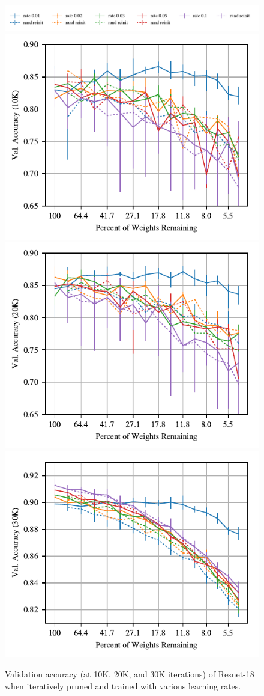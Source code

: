 \begin{figure}
\centering
\vspace{-.5em}
\includegraphics[width=.7\textwidth]{graphs/cifar10/icml/resnet18-iclr-sweep-10000/legend}
\includegraphics[width=.33\textwidth]{graphs/cifar10/icml/resnet18-iclr-sweep-10000/accuracy}%
\includegraphics[width=.33\textwidth]{graphs/cifar10/icml/resnet18-iclr-sweep-20000/accuracy}%
\includegraphics[width=.33\textwidth]{graphs/cifar10/icml/resnet18-iclr-sweep-29900/accuracy}%
\vspace{-1em}
\caption{Validation accuracy (at 10K, 20K, and 30K iterations) of Resnet-18 when iteratively pruned and trained with various learning rates.}
\label{fig:resnet18-rate}
\end{figure}

